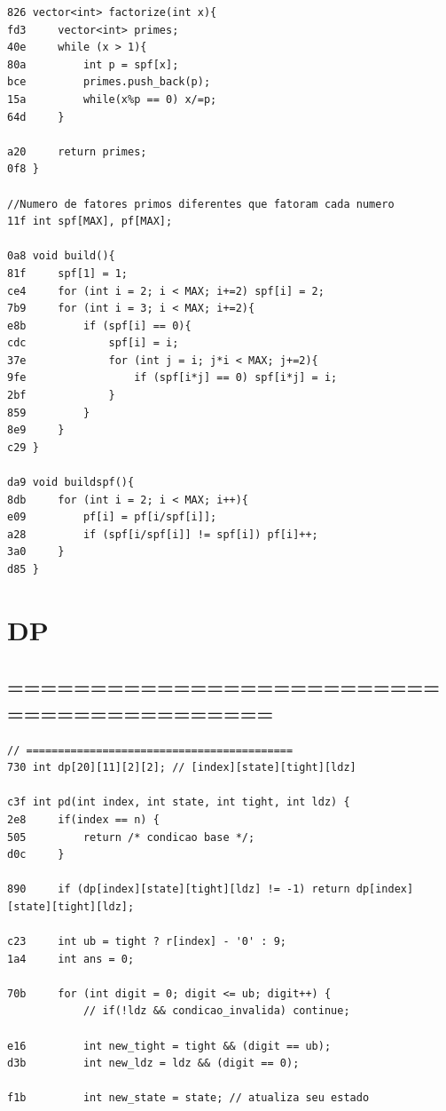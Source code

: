 \documentclass[11pt, a4paper, twoside]{article}
\begin{document}
{{\begin{lstlisting}
826 vector<int> factorize(int x){
fd3     vector<int> primes;
40e     while (x > 1){
80a         int p = spf[x];
bce         primes.push_back(p);
15a         while(x%p == 0) x/=p;
64d     }
        
a20     return primes;
0f8 }

//Numero de fatores primos diferentes que fatoram cada numero
11f int spf[MAX], pf[MAX];

0a8 void build(){
81f     spf[1] = 1;
ce4     for (int i = 2; i < MAX; i+=2) spf[i] = 2;
7b9     for (int i = 3; i < MAX; i+=2){
e8b         if (spf[i] == 0){
cdc             spf[i] = i;
37e             for (int j = i; j*i < MAX; j+=2){
9fe                 if (spf[i*j] == 0) spf[i*j] = i;
2bf             }
859         }
8e9     }
c29 }

da9 void buildspf(){
8db     for (int i = 2; i < MAX; i++){
e09         pf[i] = pf[i/spf[i]];
a28         if (spf[i/spf[i]] != spf[i]) pf[i]++;
3a0     } 
d85 }
\end{lstlisting}



%
%

\section{DP}

\subsection{==========================================}
\begin{lstlisting}
// ==========================================
730 int dp[20][11][2][2]; // [index][state][tight][ldz]

c3f int pd(int index, int state, int tight, int ldz) {
2e8     if(index == n) {
505         return /* condicao base */;
d0c     }
        
890     if (dp[index][state][tight][ldz] != -1) return dp[index][state][tight][ldz];
    
c23     int ub = tight ? r[index] - '0' : 9;
1a4     int ans = 0;
    
70b     for (int digit = 0; digit <= ub; digit++) {
            // if(!ldz && condicao_invalida) continue;
    
e16         int new_tight = tight && (digit == ub);
d3b         int new_ldz = ldz && (digit == 0);
            
f1b         int new_state = state; // atualiza seu estado
    

\end{lstlisting}}}
\end{document}

